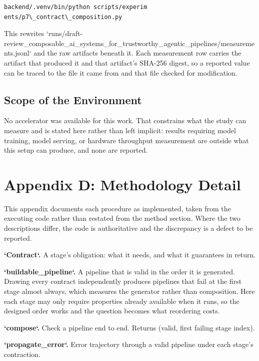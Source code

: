 \documentclass[10pt,twocolumn,letterpaper]{article}
\begin{document}
\begin{scriptsize}
\begin{verbatim}
backend/.venv/bin/python scripts/experim
ents/p7\_contract\_composition.py
\end{verbatim}
\end{scriptsize}


This rewrites `runs/draft-review\_composable\_ai\_systems\_for\_trustworthy\_agentic\_pipelines/measurements.jsonl` and the raw artifacts beneath it. Each measurement row carries the artifact that produced it and that artifact's SHA-256 digest, so a reported value can be traced to the file it came from and that file checked for modification.


\subsection{Scope of the Environment}


No accelerator was available for this work. That constrains what the study can measure and is stated here rather than left implicit: results requiring model training, model serving, or hardware throughput measurement are outside what this setup can produce, and none are reported.




\section{Appendix D: Methodology Detail}


This appendix documents each procedure as implemented, taken from the executing code rather than restated from the method section. Where the two descriptions differ, the code is authoritative and the discrepancy is a defect to be reported.

\textbf{`Contract`.} A stage's obligation: what it needs, and what it guarantees in return.

\textbf{`buildable\_pipeline`.} A pipeline that is valid in the order it is generated. Drawing every contract independently produces pipelines that fail at the first stage almost always, which measures the generator rather than composition. Here each stage may only require properties already available when it runs, so the designed order works and the question becomes what reordering costs.

\textbf{`compose`.} Check a pipeline end to end. Returns (valid, first failing stage index).

\textbf{`propagate\_error`.} Error trajectory through a valid pipeline under each stage's contraction.
\end{document}
